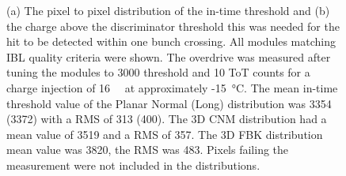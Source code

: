 \label{sec:module_qa}
\begin{figure}
\centering
    \caption{\textbf{}(a) The pixel to pixel distribution of the in-time threshold and (b) the charge above the discriminator threshold this was needed for the hit to be detected within one bunch crossing. All modules matching IBL quality criteria were shown. The overdrive was measured after tuning the modules to \SI{3000}{\e} threshold and 10 ToT counts for a charge injection of \SI{16}{\kilo\e} at approximately -\SI{15}{\celsius}. The mean in-time threshold value of the Planar Normal (Long) distribution was \SI{3354}{\e} (\SI{3372}{\e}) with a RMS of \SI{313}{\e} (\SI{400}{\e}).%
The 3D CNM distribution had a mean value of \SI{3519}{\e} and a RMS of \SI{357}{\e}. %
The 3D FBK distribution mean value was \SI{3820}{\e}, the RMS was \SI{483}{\e}.%
Pixels failing the measurement were not included in the distributions.}
    \label{fig:modules:Timing_Scans}
\end{figure}

